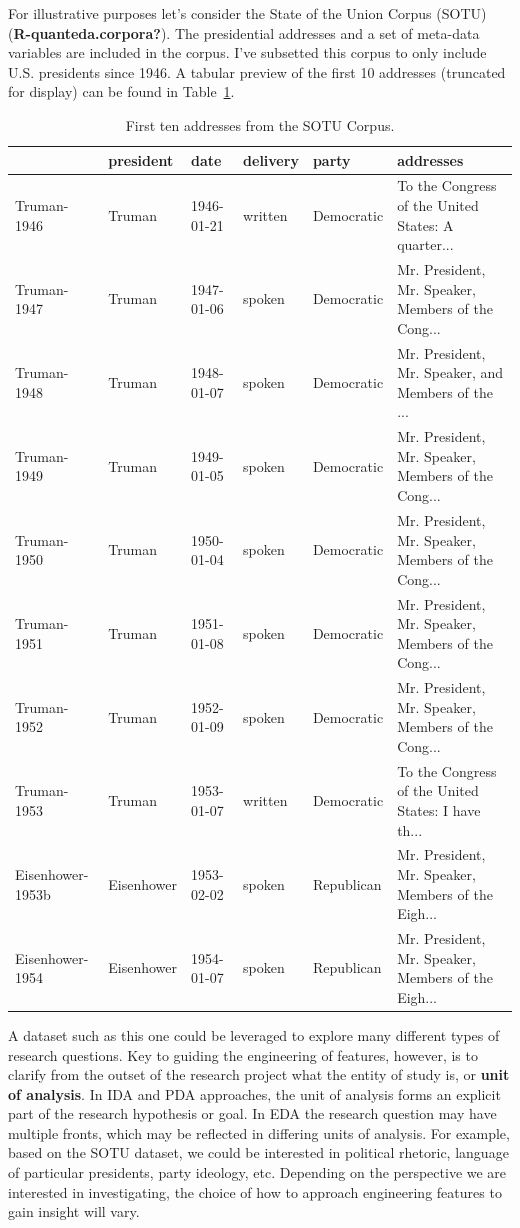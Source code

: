 \documentclass[
  letterpaper,
]{latex/krantz}
\begin{document}
For illustrative purposes let's consider the State of the Union Corpus
(SOTU) (\textbf{R-quanteda.corpora?}). The presidential addresses and a
set of meta-data variables are included in the corpus. I've subsetted
this corpus to only include U.S. presidents since 1946. A tabular
preview of the first 10 addresses (truncated for display) can be found
in Table~\ref{tbl-eda-sotu-corpus}.

\hypertarget{tbl-eda-sotu-corpus}{}
\begin{table}
\caption{\label{tbl-eda-sotu-corpus}First ten addresses from the SOTU Corpus. }\tabularnewline

\centering
\begin{tabular}{l|l|l|l|l|l}
\hline
  & president & date & delivery & party & addresses\\
\hline
Truman-1946 & Truman & 1946-01-21 & written & Democratic & To the Congress of the United States: A quarter...\\
\hline
Truman-1947 & Truman & 1947-01-06 & spoken & Democratic & Mr. President, Mr. Speaker, Members of the Cong...\\
\hline
Truman-1948 & Truman & 1948-01-07 & spoken & Democratic & Mr. President, Mr. Speaker, and Members of the ...\\
\hline
Truman-1949 & Truman & 1949-01-05 & spoken & Democratic & Mr. President, Mr. Speaker, Members of the Cong...\\
\hline
Truman-1950 & Truman & 1950-01-04 & spoken & Democratic & Mr. President, Mr. Speaker, Members of the Cong...\\
\hline
Truman-1951 & Truman & 1951-01-08 & spoken & Democratic & Mr. President, Mr. Speaker, Members of the Cong...\\
\hline
Truman-1952 & Truman & 1952-01-09 & spoken & Democratic & Mr. President, Mr. Speaker, Members of the Cong...\\
\hline
Truman-1953 & Truman & 1953-01-07 & written & Democratic & To the Congress of the United States: I have th...\\
\hline
Eisenhower-1953b & Eisenhower & 1953-02-02 & spoken & Republican & Mr. President, Mr. Speaker, Members of the Eigh...\\
\hline
Eisenhower-1954 & Eisenhower & 1954-01-07 & spoken & Republican & Mr. President, Mr. Speaker, Members of the Eigh...\\
\hline
\end{tabular}
\end{table}

A dataset such as this one could be leveraged to explore many different
types of research questions. Key to guiding the engineering of features,
however, is to clarify from the outset of the research project what the
entity of study is, or \textbf{unit of analysis}. In IDA and PDA
approaches, the unit of analysis forms an explicit part of the research
hypothesis or goal. In EDA the research question may have multiple
fronts, which may be reflected in differing units of analysis. For
example, based on the SOTU dataset, we could be interested in political
rhetoric, language of particular presidents, party ideology, etc.
Depending on the perspective we are interested in investigating, the
choice of how to approach engineering features to gain insight will
vary.
\end{document}
